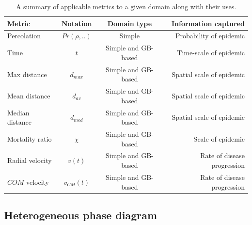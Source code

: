 \begin{table}[h!]
  \begin{center}
    \begin{tabular}{l|c|c|r} %
    \hline
      \textbf{Metric} & \textbf{Notation} & \textbf{Domain type} & \textbf{Information captured}\\
      \hline
      Percolation & $Pr(\rho,..)$ & Simple & Probability of epidemic \\
      Time & $t$ & Simple and GB-based & Time-scale of epidemic  \\
      Max distance & $d_{max}$ & Simple and GB-based & Spatial scale of epidemic\\
      Mean distance & $d_{av}$ & Simple and GB-based & Spatial scale of epidemic\\
      Median distance & $d_{med}$ & Simple and GB-based & Spatial scale of epidemic\\
      Mortality ratio & $\chi$ & Simple and GB-based & Scale of epidemic\\
      Radial velocity & $v(t)$ & Simple and GB-based & Rate of disease progression \\
      $COM$ velocity & $v_{CM}(t)$ & Simple and GB-based & Rate of disease progression\\
    \hline
    \end{tabular}
    \caption{A summary of applicable metrics to a given domain along with their uses.}
    \label{tab:metrics}
  \end{center}
\end{table}

\subsection{Heterogeneous phase diagram}

